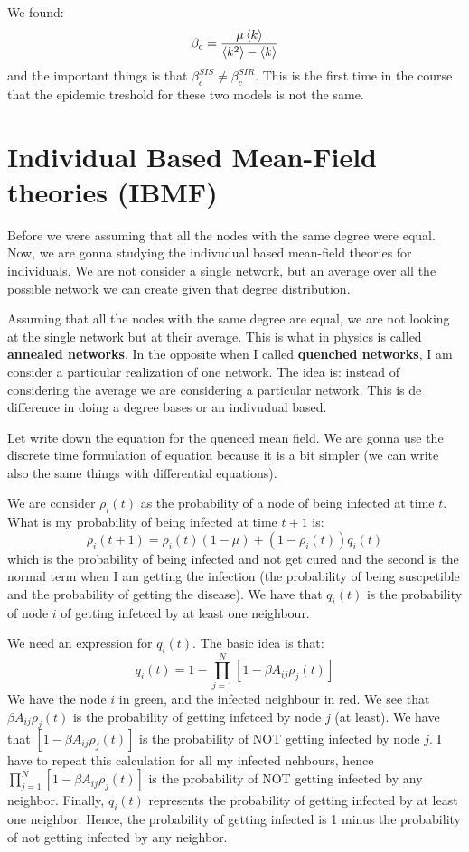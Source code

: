 \documentclass[../main/main.tex]{subfiles}
\begin{document}
We found:
\begin{equation*}
  \beta _c = \frac{\mu \expval{k} }{\expval{k^2} - \expval{k} }
\end{equation*}
and the important things is that \( \beta _c^{SIS} \neq \beta _c^{SIR} \). This is the first time in the course that the epidemic treshold for these two models is not the same.

\section{Individual Based Mean-Field theories (IBMF)}

Before we were assuming that all the nodes with the same degree were equal. Now, we are gonna studying the indivudual based mean-field theories for individuals.
We are not consider a single network, but an average over all the possible network we can create given that degree distribution.

Assuming that all the nodes with the same degree are equal, we are not looking at the single network but at their average. This is what in physics is called \textbf{annealed networks}.
In the opposite when I called \textbf{quenched networks}, I am consider a particular realization of one network. The idea is: instead of considering the average we are considering a particular network. This is de difference in doing a degree bases or an indivudual based.

Let write down the equation for the quenced mean field. We are gonna use the discrete time formulation of equation because it is a bit simpler (we can write also the same things with differential equations).

We are consider \( \rho _i (t) \) as the probability of a node of being infected at time \( t \). What is my probability of being infected at time \( t+1 \) is:
\begin{equation*}
  \rho _i (t+1) = \rho _i(t) (1- \mu ) + (1 - \rho _i(t))q_i(t)
\end{equation*}
which is the probability of being infected and not get cured and the second is the normal term when I am getting the infection (the probability of being suscpetible and the probability of getting the disease).
We have that \( q_i(t) \) is the probability of node \( i \) of getting infetced by at least one neighbour.

We need an expression for \( q_i(t) \). The basic idea is that:
\begin{equation*}
  q_i (t) = 1 - \prod_{j=1}^{N} [1- \beta A_{ij} \rho _j (t)]
\end{equation*}
We have the node \( i \) in green, and the infected neighbour in red. We see that \( \beta A_{ij} \rho _j (t) \) is the probability of getting infetced by node \( j \) (at least). We have that  \( [1- \beta A_{ij} \rho _j (t)] \) is the probability of NOT getting infected by node \( j \). I have to repeat this calculation for all my infected nehbours, hence \( \prod_{j=1}^{N} [1- \beta A_{ij} \rho _j (t)] \) is the probability of NOT getting infected by any neighbor.
Finally, \(   q_i (t) \) represents the probability of getting infected by at least one neighbor.
Hence, the probability of getting infected is 1 minus the probability of not getting infected by any neighbor.
\end{document}
